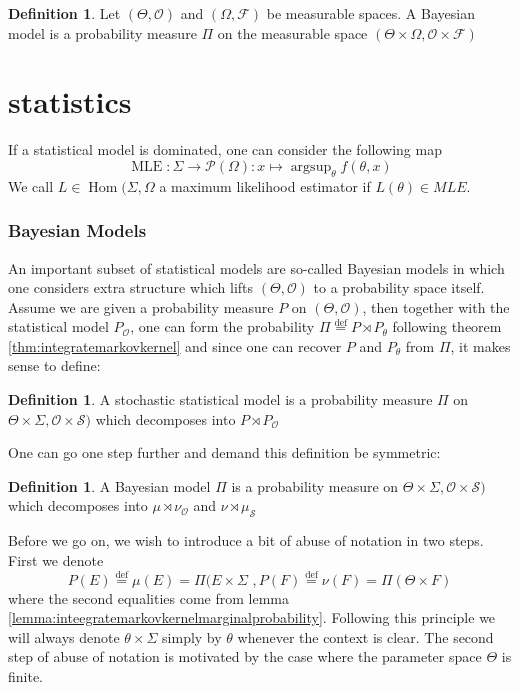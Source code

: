 \documentclass{book}
\theoremstyle{plain}
\theoremstyle{definition}
\newtheorem{definition}[corollary]{Definition}
\DeclareMathOperator{\argsup}{argsup}
\newcommand{\define}{\stackrel{\operatorname{def}}{=}}
\newcommand{\fun}{\mapsto}
\DeclareMathOperator{\Hom}{Hom}
\DeclareMathOperator{\MLE}{MLE}
\newcommand{\mor}{\longrightarrow}
\renewcommand{\r}[1]{\mathcal{#1}}
\renewcommand{\r}[1]{\mathcal{#1}}
\begin{document}
\begin{definition}
Let $(\Theta,\r{O})$ and $(\Omega,\r{F})$ be measurable spaces.
A Bayesian model is a probability measure $\Pi$ on the measurable space $(\Theta\times \Omega, \r{O}\times\r{F})$
\end{definition}

\part{statistics}



If a statistical model is dominated, one can consider the following map
\[
\MLE: \Sigma\mor \r{P}(\Omega):x \fun \argsup_\theta f(\theta,x)
\]
We call $L \in \Hom(\Sigma,\Omega$ a maximum likelihood estimator if $L(\theta)\in MLE$.
\section{Bayesian Models}



An important subset of statistical models are so-called Bayesian models in which one considers extra structure which lifts $(\Theta,\r{O})$ to a probability space itself. Assume we are given a probability measure $P$ on $(\Theta,\r{O})$, then together with the statistical model $P_\r{O}$, one can form the probability $\Pi\define P\rtimes P_\theta$ following theorem \ref{thm:integratemarkovkernel}  and since one can recover $P$ and $P_\theta$ from $\Pi$, it makes sense to define:
\begin{definition}\label{def:stochasticmodel}
A stochastic statistical model is a probability measure $\Pi$ on $\Theta\times \Sigma, \r{O}\times \r{S})$ which decomposes into $P\rtimes P_\r{O}$
\end{definition}

One can go one step further and demand this definition be symmetric:

\begin{definition}\label{def:bayesianmodel}
A Bayesian model  $\Pi$ is a probability measure on $\Theta\times \Sigma, \r{O}\times \r{S})$ which decomposes into $\mu \rtimes \nu_\r{O}$ and $\nu\rtimes \mu_\r{S}$	
\end{definition}

Before we go on, we wish to introduce a bit of abuse of notation in two steps. First we denote
\[
P(E)\define \mu(E)=\Pi(E\times \Sigma \,\,, P(F)\define \nu(F)=\Pi(\Theta\times F)
\]
where the second equalities come from lemma \ref{lemma:inteegratemarkovkernelmarginalprobability}. Following this principle we will always denote $\theta \times \Sigma$ simply by $\theta$ whenever the context is clear.
The second step of abuse of notation is motivated by the case where the parameter space $\Theta$ is finite.\\
\end{document}
